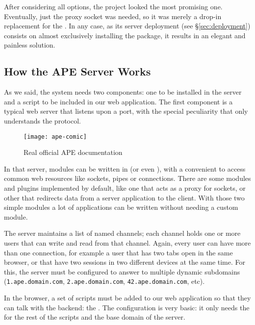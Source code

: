 After considering all options, the  project looked the most promising one.
Eventually, just the proxy socket was needed, so it was merely a drop-in replacement for the .
In any case, as its server deployment (see \S\vref{sec:deployment}) consists on almost exclusively installing the   package, it results in an elegant and painless solution.


\subsection{How the APE Server Works} %
\label{sub:how_the_ape_server_works}

As we said, the system needs two components: one to be installed in the server and a script to be included in our web application.
The first component is a typical web server that listens upon a port, with the special peculiarity that only understands the  protocol.

\begin{wrapfigure}{r}{0.5\textwidth}
  \centering
    \texttt{[image: ape-comic]}
  \caption{Real official APE documentation}
  \label{fig:ape-comic}
\end{wrapfigure}

In that server, modules can be written in  (or even ), with a convenient  to access common web resources like sockets, pipes or  connections.
There are some modules and plugins implemented by default, like one that acts as a proxy for  sockets, or other that redirects data from a server application to the client.
With those two simple modules a lot of applications can be written without needing a custom module.

The server maintains a list of named channels; each channel holds one or more users that can write and read from that channel.
Again, every user can have more than one connection, for example a user that has two tabs open in the same browser, or that have two sessions in two different devices at the same time.
For this, the server  must be configured to answer to multiple dynamic subdomains  (\verb|1.ape.domain.com|, \verb|2.ape.domain.com|, \verb|42.ape.domain.com|, etc).

In the browser, a set of scripts must be added to our web application so that they can talk with the backend: the  .
The configuration is very basic: it only needs the  for the rest of the scripts and the base domain of the  server.

